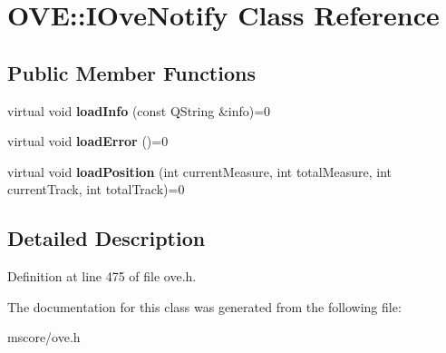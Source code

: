 \hypertarget{class_o_v_e_1_1_i_ove_notify}{}\section{O\+VE\+:\+:I\+Ove\+Notify Class Reference}
\label{class_o_v_e_1_1_i_ove_notify}
\subsection*{Public Member Functions}
\begin{DoxyCompactItemize}
\item 
\mbox{\label{class_o_v_e_1_1_i_ove_notify_a3030ada16cf569aee0faba6e6079043e}} 
virtual void {\bfseries load\+Info} (const Q\+String \&info)=0
\item 
\mbox{\label{class_o_v_e_1_1_i_ove_notify_ac7069abfe1613f72b03be07541c12e5c}} 
virtual void {\bfseries load\+Error} ()=0
\item 
\mbox{\label{class_o_v_e_1_1_i_ove_notify_a91170a82af07469be83973918ea36b2f}} 
virtual void {\bfseries load\+Position} (int current\+Measure, int total\+Measure, int current\+Track, int total\+Track)=0
\end{DoxyCompactItemize}


\subsection{Detailed Description}


Definition at line 475 of file ove.\+h.



The documentation for this class was generated from the following file\+:\begin{DoxyCompactItemize}
\item 
mscore/ove.\+h\end{DoxyCompactItemize}
